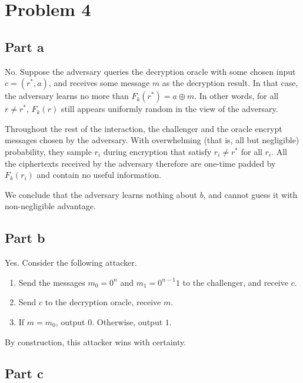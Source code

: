 \documentclass{article}
\theoremstyle{definition}
\begin{document}
\section*{Problem 4}

\subsection*{Part a}

No.
Suppose the adversary queries the decryption oracle with some chosen input $c=(r^*, a)$, and receives some message $m$ as the decryption result.
In that case, the adversary learns no more than $F_k(r^*)=a\oplus m$.
In other words, for all $r\ne r^*$, $F_k(r)$ still appears uniformly random in the view of the adversary.

Throughout the rest of the interaction,
the challenger and the oracle encrypt messages chosen by the adversary.
With overwhelming (that is, all but negligible) probability,
they sample $r_i$ during encryption that satisfy $r_i\ne r^*$ for all $r_i$.
All the ciphertexts received by the adversary therefore are one-time padded by $F_k(r_i)$ and contain no useful information.

We conclude that the adversary learns nothing about $b$, and cannot guess it with non-negligible advantage.

\subsection*{Part b}

Yes.
Consider the following attacker.
\begin{enumerate}
    \item Send the messages $m_0=0^n$ and $m_1=0^{n-1}1$ to the challenger, and receive $c$.
    \item Send $c$ to the decryption oracle, receive $m$.
    \item If $m=m_0$, output $0$. Otherwise, output $1$.
\end{enumerate}
By construction, this attacker wins with certainty.

\subsection*{Part c}
\end{document}
